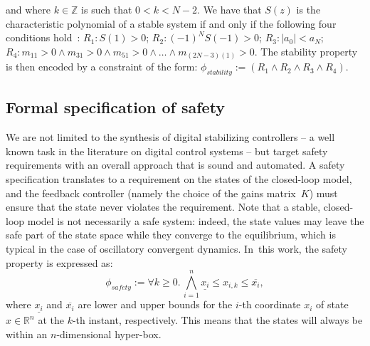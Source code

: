 \documentclass[twocolumn]{autart}    %
\newcommand{\addtodo}[1]{\textcolor{red}{[#1]}}
\begin{document}
%
and where $k \in \mathbb{Z}$ is such that $0 < k < N - 2$. 
We have that $S(z)$ is the characteristic polynomial of a stable system if and only if the following four conditions hold~\cite{astrom1997computer}:
$R_1: S(1) > 0$;
$R_2: (-1)^N S(-1) > 0$;
$R_3: |a_0| < a_N$;
$R_4: m_{11} > 0 \wedge\allowbreak
      m_{31}>0 \wedge\allowbreak
      m_{51}>0 \wedge \ldots \wedge\allowbreak
      m_{(2N{-}3)(1)}>0$.
%
The stability property is then encoded by a constraint of the form:
$
\phi_\mathit{stability} := (R_1 \wedge R_2 \wedge R_3 \wedge R_4).
$


\subsection{Formal specification of safety} 
\label{ssec:safespecification}

We are not limited to the synthesis of digital stabilizing controllers -- a
well known task in the literature on digital control systems -- but target
safety requirements with an overall approach that is sound and automated. 
A safety specification translates to a requirement on the states of the closed-loop model, 
and the feedback controller (namely the choice of the gains matrix~$K$) 
must ensure that the state never violates the requirement.  
Note that a stable, closed-loop model is not necessarily a safe system: 
indeed, the state values may leave the safe part of the state space while they converge
to the equilibrium, which is typical in the case of oscillatory convergent dynamics. 
In~this work, the safety property is expressed as:
%
\begin{equation}
\label{eq:safetyliteral}
\phi_\mathit{safety} := \forall k\ge 0.\, \bigwedge_{i=1}^{n}{\underline{x_{i}} \leq x_{i,k} \leq \overline{x_{i}}},
\end{equation}
%
%
where $\underline{x_{i}}$ and $\overline{x_{i}}$ are lower and upper bounds
for the $i$-th coordinate $x_{i}$ of state $x\in \mathbb R^n$ at the $k$-th
instant, respectively.  This means that the states will always be within an $n$-dimensional hyper-box.
\end{document}
